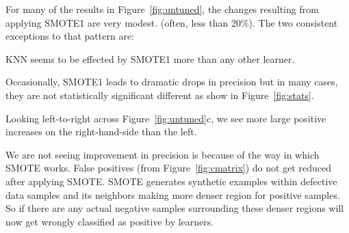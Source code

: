 For many of the results in  Figure~\ref{fig:untuned}, the changes
resulting from applying SMOTE1 are very modest. (often, less than 20\%).
The two consistent exceptions to that pattern are:
\bi
\item 
KNN seems to be effected by SMOTE1 more than any other learner.
\item 
Occasionally, SMOTE1 leads to dramatic drops in precision but in many cases, they are not statistically significant different as show in Figure~\ref{fig:stats}.
\item 
Looking left-to-right across
Figure~\ref{fig:untuned}c, we see more
large positive increases on the
right-hand-side than the left.   
\ei

We are not seeing improvement in precision is because of the way in which SMOTE works. False positives (from Figure~\ref{fig:cmatrix}) do not get reduced after applying SMOTE. SMOTE generates synthetic examples within defective data samples and its neighbors making more denser region for positive samples. So if there are any actual negative samples surrounding these denser regions will now get wrongly classified as positive by learners. 







